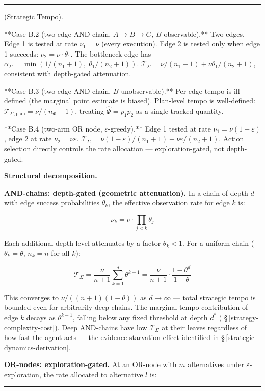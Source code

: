 \documentclass[11pt,oneside]{article}
\newcounter{claim}[section]
\renewcommand{\theclaim}{\thesection.\arabic{claim}}
\newenvironment{segment}[2]{%
  \refstepcounter{claim}%
  \bigskip\noindent\hrule\smallskip
  \noindent{\bfseries #1~\theclaim}\enskip(#2).\par\smallskip
  \noindent\ignorespaces
}{%
  \par\smallskip\noindent\hrule\bigskip
}
\newenvironment{definition}[1][]{\begin{segment}{Definition}{#1}}{\end{segment}}
\begin{document}
\begin{definition}[Strategic Tempo]
**Case B.2 (two-edge AND chain, $A \to B \to G$, $B$ observable).** Two edges. Edge 1 is tested at rate $\nu_1 = \nu$ (every execution). Edge 2 is tested only when edge 1 succeeds: $\nu_2 = \nu \cdot \theta_1$. The bottleneck edge has $\alpha_\Sigma = \min(1/(n_1+1),\; \theta_1/(n_2+1))$. $\mathcal T_\Sigma = \nu/(n_1+1) + \nu\theta_1/(n_2+1)$, consistent with depth-gated attenuation.

**Case B.3 (two-edge AND chain, $B$ unobservable).** Per-edge tempo is ill-defined (the marginal point estimate is biased). Plan-level tempo is well-defined: $\mathcal T_{\Sigma,\text{plan}} = \nu/(n_\Phi + 1)$, treating $\hat\Phi = p_1 p_2$ as a single tracked quantity.

**Case B.4 (two-arm OR node, $\varepsilon$-greedy).** Edge 1 tested at rate $\nu_1 = \nu(1-\varepsilon)$, edge 2 at rate $\nu_2 = \nu\varepsilon$. $\mathcal T_\Sigma = \nu(1-\varepsilon)/(n_1+1) + \nu\varepsilon/(n_2+1)$. Action selection directly controls the rate allocation --- exploration-gated, not depth-gated.


\medskip\noindent\textbf{Structural decomposition.}


\textbf{AND-chains: depth-gated (geometric attenuation).} In a chain of depth $d$ with edge success probabilities $\theta_k$, the effective observation rate for edge $k$ is:


$$\nu_k = \nu \cdot \prod_{j < k} \theta_j$$

Each additional depth level attenuates by a factor $\theta_k < 1$. For a uniform chain ($\theta_k = \theta$, $n_k = n$ for all $k$):

$$\mathcal{T}_\Sigma = \frac{\nu}{n+1} \sum_{k=1}^{d} \theta^{k-1} = \frac{\nu}{n+1} \cdot \frac{1 - \theta^d}{1 - \theta}$$

This converges to $\nu / ((n+1)(1-\theta))$ as $d \to \infty$ --- total strategic tempo is bounded even for arbitrarily deep chains. The marginal tempo contribution of edge $k$ decays as $\theta^{k-1}$, falling below any fixed threshold at depth $d^*$ ( \S\,\ref{strategy-complexity-cost}). Deep AND-chains have low $\mathcal T_\Sigma$ at their leaves regardless of how fast the agent acts --- the evidence-starvation effect identified in \S\,\ref{strategic-dynamics-derivation}.

\textbf{OR-nodes: exploration-gated.} At an OR-node with $m$ alternatives under $\varepsilon$-exploration, the rate allocated to alternative $l$ is:



\end{definition}
\end{document}
